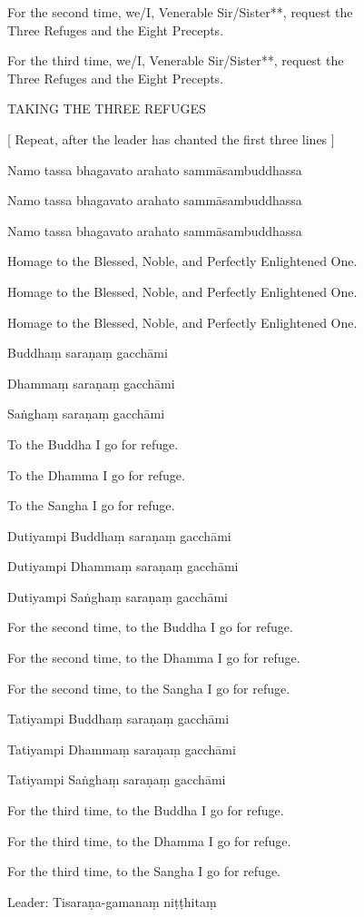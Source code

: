 For the second time, we/I, Venerable Sir/Sister**, request the \\
Three Refuges and the Eight Precepts.

For the third time, we/I, Venerable Sir/Sister**, request the \\
Three Refuges and the Eight Precepts.

TAKING THE THREE REFUGES

[ Repeat, after the leader has chanted the first three lines ]

Namo tassa bhagavato arahato sammāsambuddhassa

Namo tassa bhagavato arahato sammāsambuddhassa

Namo tassa bhagavato arahato sammāsambuddhassa

Homage to the Blessed, Noble, and Perfectly Enlightened One.

Homage to the Blessed, Noble, and Perfectly Enlightened One.

Homage to the Blessed, Noble, and Perfectly Enlightened One.

Buddhaṃ saraṇaṃ gacchāmi

Dhammaṃ saraṇaṃ gacchāmi

Saṅghaṃ saraṇaṃ gacchāmi

To the Buddha I go for refuge.

To the Dhamma I go for refuge.

To the Sangha I go for refuge.

Dutiyampi Buddhaṃ saraṇaṃ gacchāmi

Dutiyampi Dhammaṃ saraṇaṃ gacchāmi

Dutiyampi Saṅghaṃ saraṇaṃ gacchāmi

For the second time, to the Buddha I go for refuge.

For the second time, to the Dhamma I go for refuge.

For the second time, to the Sangha I go for refuge.

Tatiyampi Buddhaṃ saraṇaṃ gacchāmi

Tatiyampi Dhammaṃ saraṇaṃ gacchāmi

Tatiyampi Saṅghaṃ saraṇaṃ gacchāmi

For the third time, to the Buddha I go for refuge.

For the third time, to the Dhamma I go for refuge.

For the third time, to the Sangha I go for refuge.

Leader: Tisaraṇa-gamanaṃ niṭṭhitaṃ

